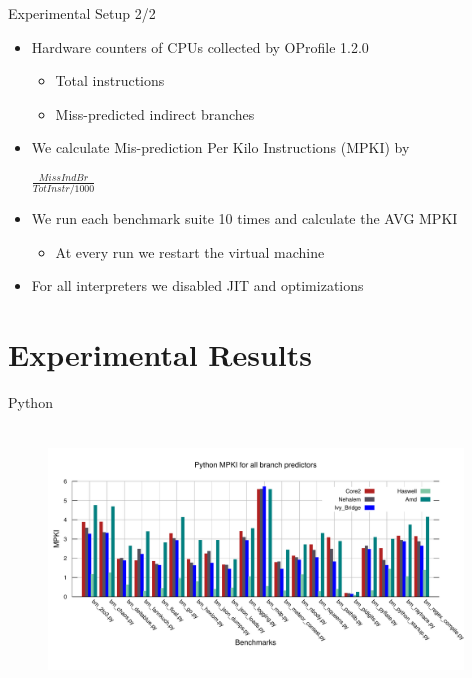 \documentclass[10pt]{beamer}
\begin{document}
\begin{frame}{Experimental Setup 2/2}
	\begin{itemize}
		\item {Hardware counters of CPUs collected by OProfile 1.2.0}
			\begin{itemize}
				\item {Total instructions}
				\item {Miss-predicted indirect branches}
			\end{itemize}
		\item {We calculate Mis-prediction Per Kilo Instructions (MPKI) by} 
            \begin{center}
                $\frac{MissIndBr}{TotInstr/1000} $%
            \end{center}
		\item {We run each benchmark suite 10 times and calculate the AVG MPKI}
		\begin{itemize}
			\item {At every run we restart the virtual machine}
		\end{itemize}
		\item {For all interpreters we disabled JIT and optimizations}
		
	\end{itemize}
\end{frame}

\section{Experimental Results}
\begin{frame}{Python}
    \begin{figure}[t]
        \centering
        \includegraphics[width=11cm, height=7cm]{figures/python_MPKI.pdf}
    \end{figure}
\end{frame}
\end{document}
